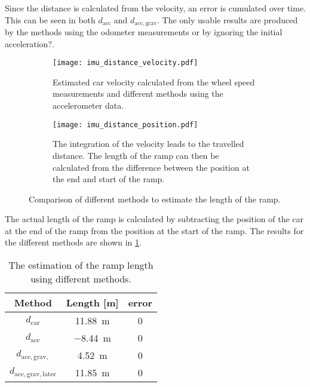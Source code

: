 Since the distance is calculated from the velocity, an error is cumulated over time.
This can be seen in both $d_\mathrm{acc}$ and $d_\mathrm{acc, grav}$.
The only usable results are produced by the methods using the odometer measurements or by ignoring the initial acceleration?.
\begin{figure}[htb]
	\centering
	\begin{subfigure}{1\textwidth}
		\centering
		\texttt{[image: imu\_distance\_velocity.pdf]}
		\caption{Estimated car velocity calculated from the wheel speed measurements and different methods using the accelerometer data.}
		\label{fig:imu_distance_velocity}
	\end{subfigure}
	
	\begin{subfigure}{1\textwidth}
		\centering
		\texttt{[image: imu\_distance\_position.pdf]}
		\caption{The integration of the velocity leads to the travelled distance. The length of the ramp can then be calculated from the difference between the position at the end and start of the ramp.}
		\label{fig:imu_distance_position}
	\end{subfigure}
	\caption{Comparison of different methods to estimate the length of the ramp.}
\end{figure}

The actual length of the ramp is calculated by subtracting the position of the car at the end of the ramp from the position at the start of the ramp.
The results for the different methods are shown in \cref{tab:ramp_length}.

\begin{table}[htb]
	\centering
	\caption[Ramp length]{The estimation of the ramp length using different methods.}
	\label{tab:ramp_length}
	\begin{tabular}[t]{ccc}
		\toprule
		\textbf{Method}                & \textbf{Length} [\si{\metre}] & \textbf{error} \\
		\midrule
		$d_\mathrm{car} $              & \SI{11.88}{\metre}            & 0              \\
		$d_\mathrm{acc} $              & \SI{-8.44}{\metre}            & 0              \\
		$d_\mathrm{acc, grav, } $      & \SI{4.52}{\metre}             & 0              \\
		$d_\mathrm{acc, grav, later} $ & \SI{11.85}{\metre}            & 0              \\
		\bottomrule
	\end{tabular}
\end{table}



